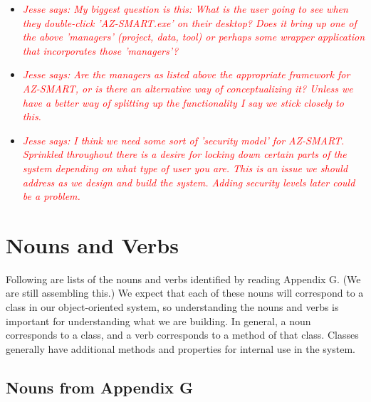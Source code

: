 \documentclass[titlepage]{article}
\begin{document}
\begin{itemize}
	\item \textcolor{red}{\textit{Jesse says: My biggest question is this: What is the user going to see when they double-click 'AZ-SMART.exe' on their desktop?  Does it bring up one of the above 'managers' (project, data, tool) or perhaps some wrapper application that incorporates those 'managers'?}}
	\item \textcolor{red}{\textit{Jesse says: Are the managers as listed above the appropriate framework for AZ-SMART, or is there an alternative way of conceptualizing it?  Unless we have a better way of splitting up the functionality I say we stick closely to this.}}
	\item \textcolor{red}{\textit{Jesse says: I think we need some sort of 'security model' for AZ-SMART.  Sprinkled throughout there is a desire for locking down certain parts of the system depending on what type of user you are.  This is an issue we should address as we design and build the system. Adding security levels later could be a problem.}}
\end{itemize}


\section{Nouns and Verbs}

Following are lists of the nouns and verbs identified by reading Appendix G.  (We are still assembling this.)  We expect that each of these nouns will correspond to a class in our object-oriented system, so understanding the nouns and verbs is important for understanding what we are building.  In general, a noun corresponds to a class, and a verb corresponds to a method of that class.  Classes generally have additional methods and properties for internal use in the system.

\subsection{Nouns from Appendix G}
\end{document}
